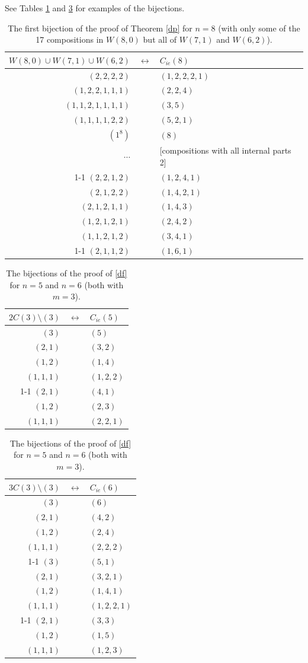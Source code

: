 \documentclass[]{interact}
\theoremstyle{plain}
\numberwithin{equation}{section} %
\numberwithin{table}{section} %
\numberwithin{figure}{section}
\begin{document}
See Tables \ref{dbij} and \ref{dfbij} for examples of the bijections.

\begin{table}[ht]
\caption{The first bijection of the proof of Theorem \ref{dp} for $n= 8$ (with only some of the 17 compositions in $W(8,0)$ but all of $W(7,1)$ and $W(6,2)$).} 
\medskip
\centering
\begin{tabular}{rcl}
$W(8,0) \cup W(7,1) \cup W(6,2)$ & $\longleftrightarrow$ & $C_{ie}(8)$ \\ \hline
$(2,2,2,2)$ & & $(1,2,2,2,1)$ \\
$(1,2,2,1,1,1)$ & & $(2,2,4)$ \\ 
$(1,1,2,1,1,1,1)$ & & $(3,5)$ \\
$(1,1,1,1,2,2)$ & & $(5,2,1)$ \\
$(1^8)$ & & $(8)$ \\
$\cdots$ & & [compositions with all internal parts 2] \\ \cline{1-1}
$(2,2,1,2)$ & & $(1,2,4,1)$ \\
$(2,1,2,2)$ & & $(1,4,2,1)$ \\
$(2,1,2,1,1)$ & & $(1,4,3)$ \\
$(1,2,1,2,1)$ & & $(2,4,2)$ \\
$(1,1,2,1,2)$ & & $(3,4,1)$ \\ \cline{1-1}
$(2,1,1,2)$ & & $(1,6,1)$
\end{tabular}
\label{dbij}
\end{table}

\begin{table}[ht]
\caption{The bijections of the proof of \eqref{df} for $n= 5$ and $n = 6$ (both with $m = 3$).} 
\medskip
\centering
\begin{tabular}{rcl}
$2C(3) \setminus (3)$ & $\longleftrightarrow$ & $C_{ie}(5)$ \\ \hline
$(3)$ & & $(5)$ \\
$(2,1)$ & & $(3,2)$ \\ 
$(1,2)$ & & $(1,4)$ \\
$(1,1,1)$ & & $(1,2,2)$ \\ \cline{1-1}
$(2,1)$ & & $(4,1)$ \\
$(1,2)$ & & $(2,3)$ \\
$(1,1,1)$ & & $(2,2,1)$
\end{tabular}
\qquad
\begin{tabular}{rcl}
$3C(3) \setminus (3)$ & $\longleftrightarrow$ & $C_{ie}(6)$ \\ \hline
$(3)$ & & $(6)$ \\
$(2,1)$ & & $(4,2)$ \\ 
$(1,2)$ & & $(2,4)$ \\
$(1,1,1)$ & & $(2,2,2)$ \\ \cline{1-1}
$(3)$ & & $(5,1)$ \\
$(2,1)$ & & $(3,2,1)$ \\ 
$(1,2)$ & & $(1,4,1)$ \\
$(1,1,1)$ & & $(1,2,2,1)$ \\ \cline{1-1}
$(2,1)$ & & $(3,3)$ \\ 
$(1,2)$ & & $(1,5)$ \\
$(1,1,1)$ & & $(1,2,3)$
\end{tabular}
\label{dfbij}
\end{table}
\end{document}
